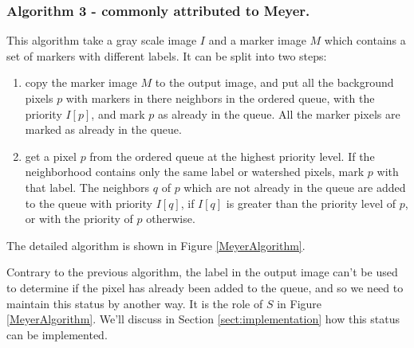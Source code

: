 \documentclass{InsightArticle}
\begin{document}
% 
% 
% 	
% 
% 
% 

\subsubsection{Algorithm 3 - commonly attributed to Meyer.}
\label{sect:MeyerAlgorithm}

This algorithm take a gray scale image $I$ and a marker image $M$
which contains a set of markers with different labels. It can be
split into two steps:
\begin{enumerate}
  \item copy the marker image $M$ to the output image, and put
all the background pixels $p$ with markers in there neighbors in the
ordered queue, with the priority $I[p]$, and mark $p$ as already in
the queue. All the marker pixels are marked as already in the queue.
  \item get a pixel $p$ from the ordered queue at the highest
priority level. If the neighborhood contains only the same label
or watershed pixels, mark $p$ with that label. The neighbors $q$ 
of $p$ which are not already in the queue are added to the queue 
with priority $I[q]$, if $I[q]$ is greater than the priority level
of $p$, or with the priority of $p$ otherwise.
\end{enumerate}

The detailed algorithm is shown in Figure \ref{MeyerAlgorithm}.

Contrary to the previous algorithm, the label in the output image
can't be used to determine if the pixel has already been added to
the queue, and so we need to maintain this status by another way.
It is the role of $S$ in Figure \ref{MeyerAlgorithm}. We'll discuss
in Section \ref{sect:implementation} how this status can be implemented.
\end{document}
